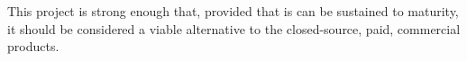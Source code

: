 This project is strong enough that, provided that is can be sustained to maturity, it should be considered a viable alternative to the closed-source, paid, commercial products.




